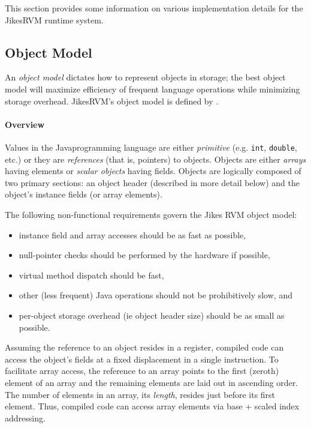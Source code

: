 This section provides some information on various
implementation details for the Jikes\trademark RVM runtime system.


\subsection{Object Model} \label{sssec:objects}
An {\em object model} dictates how to represent objects in storage;
the best object model will maximize efficiency of frequent language
operations while minimizing storage overhead. Jikes\trademark RVM's
object model 
is defined by .

\paragraph{Overview}
Values in the Java\trademark programming language are either {\em
primitive} (e.g. {\tt int}, {\tt double}, etc.)  or they are {\em
references} (that is, pointers) to objects.  Objects are either {\em
arrays} having elements or {\em scalar objects} having fields.
Objects are logically composed of two primary sections: an object
header (described in more detail below) and the object's instance
fields (or array elements). 

The following non-functional requirements govern the Jikes RVM object model:
\begin{itemize}
\item
instance field and array accesses should be as fast as possible,
\item
null-pointer checks should be performed by the hardware if possible, 
\item
virtual method dispatch should be fast,
\item
other (less frequent) Java operations should not be prohibitively
slow, and
\item
per-object storage overhead (ie object header size) should be as small
as possible.
\end{itemize}

Assuming the reference to an object resides in a register, compiled code can 
access the object's fields at a fixed displacement in a single
instruction.  To facilitate array access, the reference to an array
points to the first (zeroth) element of an array and the remaining
elements are laid out in ascending order.  The number of elements in
an array, its {\em length}, resides just before its first
element. Thus, compiled code can access array elements via base +
scaled index addressing.

